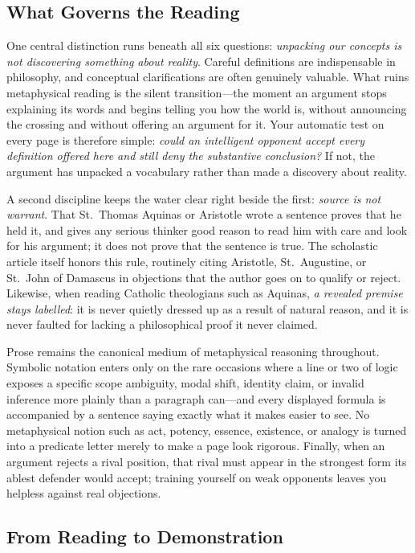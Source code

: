 \subsection*{What Governs the Reading}

One central distinction runs beneath all six questions: \emph{unpacking our concepts is not discovering something about reality}. Careful definitions are indispensable in philosophy, and conceptual clarifications are often genuinely valuable. What ruins metaphysical reading is the silent transition---the moment an argument stops explaining its words and begins telling you how the world is, without announcing the crossing and without offering an argument for it. Your automatic test on every page is therefore simple: \emph{could an intelligent opponent accept every definition offered here and still deny the substantive conclusion?} If not, the argument has unpacked a vocabulary rather than made a discovery about reality.

A second discipline keeps the water clear right beside the first: \emph{source is not warrant}. That St.\ Thomas Aquinas or Aristotle wrote a sentence proves that he held it, and gives any serious thinker good reason to read him with care and look for his argument; it does not prove that the sentence is true. The scholastic article itself honors this rule, routinely citing Aristotle, St.\ Augustine, or St.\ John of Damascus in objections that the author goes on to qualify or reject. Likewise, when reading Catholic theologians such as Aquinas, \emph{a revealed premise stays labelled}: it is never quietly dressed up as a result of natural reason, and it is never faulted for lacking a philosophical proof it never claimed.

Prose remains the canonical medium of metaphysical reasoning throughout. Symbolic notation enters only on the rare occasions where a line or two of logic exposes a specific scope ambiguity, modal shift, identity claim, or invalid inference more plainly than a paragraph can---and every displayed formula is accompanied by a sentence saying exactly what it makes easier to see. No metaphysical notion such as act, potency, essence, existence, or analogy is turned into a predicate letter merely to make a page look rigorous. Finally, when an argument rejects a rival position, that rival must appear in the strongest form its ablest defender would accept; training yourself on weak opponents leaves you helpless against real objections.

\subsection*{From Reading to Demonstration}

